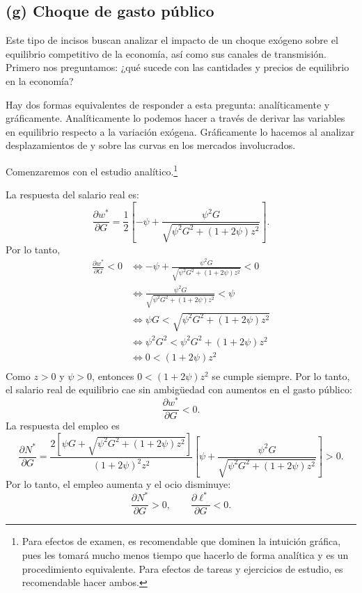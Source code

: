 \documentclass[11pt]{article}
\begin{document}
\subsection*{(g) Choque de gasto público}

Este tipo de incisos buscan analizar el impacto de un choque exógeno sobre el equilibrio competitivo de la economía, así como sus canales de transmisión. Primero nos preguntamos: ¿qué sucede con las cantidades y precios de equilibrio en la economía?

Hay dos formas equivalentes de responder a esta pregunta: analíticamente y gráficamente. Analíticamente lo podemos hacer a través de derivar las variables en equilibrio respecto a la variación exógena. Gráficamente lo hacemos al analizar desplazamientos de y sobre las curvas en los mercados involucrados.

Comenzaremos con el estudio analítico.\footnote{Para efectos de examen, es recomendable que dominen la intuición gráfica, pues les tomará mucho menos tiempo que hacerlo de forma analítica y es un procedimiento equivalente. Para efectos de tareas y ejercicios de estudio, es recomendable hacer ambos.}

La respuesta del salario real es:
\[
  \frac{\partial w^*}{\partial G}
  =\frac{1}{2}
  \left[
  -\psi + 
  \frac{\psi^2G}{\sqrt{\psi^2G^2+(1+2\psi)z^2}}
  \right].
\]
Por lo tanto, 
\begin{align*}
  \frac{\partial w^*}{\partial G} <0 
  &\iff -\psi + 
  \frac{\psi^2G}{\sqrt{\psi^2G^2+(1+2\psi)z^2}} <0 \\
  &\iff 
  \frac{\psi^2G}{\sqrt{\psi^2G^2+(1+2\psi)z^2}} < \psi \\
  &\iff
  \psi G  < \sqrt{\psi^2G^2+(1+2\psi)z^2} \\
  &\iff
  \psi^2 G^2  < \psi^2G^2+(1+2\psi)z^2 \\
  &\iff
  0 < (1+2\psi)z^2 \\
\end{align*}
Como $z>0$ y $\psi > 0$, entonces $0 < (1+2\psi)z^2$ se cumple siempre. Por lo tanto, el salario real de equilibrio cae sin ambigüedad con aumentos en el gasto público:
\[
  \boxed{\frac{\partial w^*}{\partial G}<0}.
\]
La respuesta del empleo es
\[
  \frac{\partial N^*}{\partial G}
  =\frac{2\left[\psi G+\sqrt{\psi^2G^2+(1+2\psi)z^2}\right]}
  {(1+2\psi)^2z^2}
  \left[
  \psi+\frac{\psi^2G}{\sqrt{\psi^2G^2+(1+2\psi)z^2}}
  \right]>0.
\]
Por lo tanto, el empleo aumenta y el ocio disminuye:
\[
  \boxed{\frac{\partial N^*}{\partial G}>0},
  \qquad
  \boxed{\frac{\partial\ell^*}{\partial G}<0}.
\]
\end{document}
